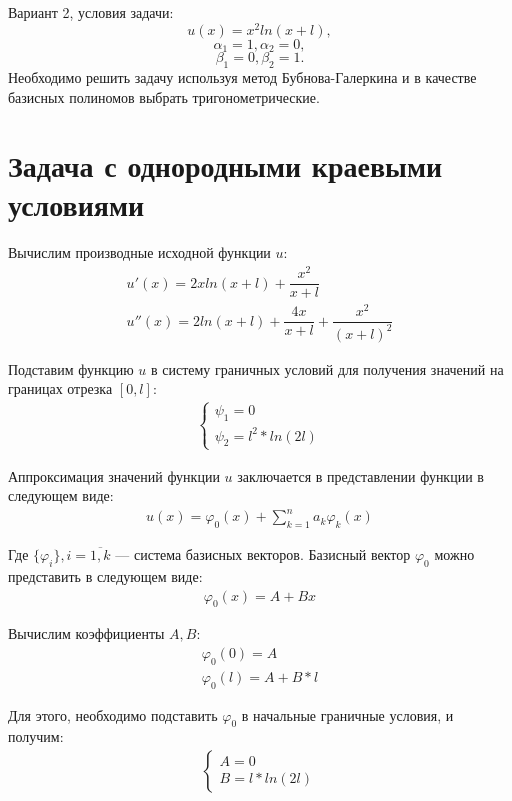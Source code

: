 \documentclass[12pt,a4paper,oneside]{extarticle}
\begin{document}
    Вариант 2, условия задачи:
    $$u(x) = x^2 ln(x+l),$$
    $$\alpha_1 = 1, \alpha_2 = 0,$$
    $$\beta_1 = 0, \beta_2 = 1.$$
    Необходимо решить задачу используя метод Бубнова-Галеркина и в качестве базисных полиномов выбрать тригонометрические.

\section{Задача с однородными краевыми условиями}
    Вычислим производные исходной функции $u$:
    \begin{gather}
        u'(x) = 2xln(x+l) + \dfrac{x^2}{x+l} \nonumber \\
        u''(x) = 2ln(x+l) + \dfrac{4x}{x+l} + \dfrac{x^2}{(x+l)^2} \nonumber
    \end{gather}

    Подставим функцию $u$ в систему граничных условий для получения значений на границах отрезка $[0, l]$:
    \begin{gather}
        \begin{cases}
            \psi_1 = 0 \nonumber \\
            \psi_2 = l^2*ln(2l) \nonumber
        \end{cases}
    \end{gather}
        
    Аппроксимация значений функции $u$ заключается в представлении функции в следующем виде:
    \begin{gather}
        u(x) = \varphi_0(x) + \sum\limits_{k=1}^{n} a_k\varphi_k(x) \nonumber
    \end{gather}
    
    Где $\{\varphi_i\}, i = \overline{1,k}$ --- система базисных векторов. 
    Базисный вектор $\varphi_0$ можно представить в следующем виде:
    \begin{gather}
        \varphi_0(x) = A + Bx \nonumber
    \end{gather}
    
    Вычислим коэффициенты $A, B$: 
    \begin{gather}
        \varphi_0(0) = A \nonumber \\
        \varphi_0(l) = A + B*l \nonumber
    \end{gather}
    
    Для этого, необходимо подставить $\varphi_0$ в начальные граничные условия, и получим:
    \begin{gather}
        \begin{cases}
            A = 0 \nonumber \\
            B = l*ln(2l) \nonumber
        \end{cases}
    \end{gather}
    
\end{document}
